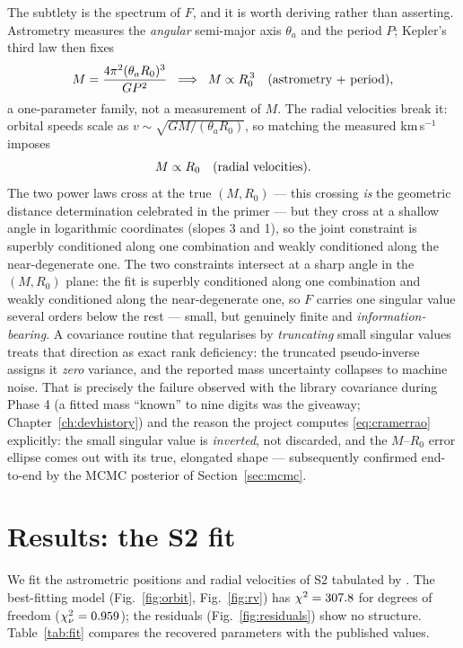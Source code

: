 The subtlety is the spectrum of $F$, and it is worth deriving rather
than asserting. Astrometry measures the \emph{angular} semi-major axis
$\theta_a$ and the period $P$; Kepler's third law then fixes
\begin{equation}
M = \frac{4\pi^2 (\theta_a R_0)^3}{G P^2}
\;\;\Longrightarrow\;\;
M \propto R_0^{\,3} \quad \hbox{(astrometry + period)},
\label{eq:astroconstraint}
\end{equation}
a one-parameter family, not a measurement of $M$. The radial
velocities break it: orbital speeds scale as
$v \sim \sqrt{GM/(\theta_a R_0)}$, so matching the measured
km\,s$^{-1}$ imposes
\begin{equation}
M \propto R_0 \quad \hbox{(radial velocities)}.
\label{eq:rvconstraint}
\end{equation}
The two power laws cross at the true $(M, R_0)$ — this crossing
\emph{is} the geometric distance determination celebrated in the
primer — but they cross at a shallow angle in logarithmic coordinates
(slopes 3 and 1), so the joint constraint is superbly conditioned
along one combination and weakly conditioned along the
near-degenerate one. The two constraints intersect at a sharp
angle in the $(M, R_0)$ plane: the fit is superbly conditioned along
one combination and weakly conditioned along the near-degenerate one,
so $F$ carries one singular value several orders below the rest —
small, but genuinely finite and \emph{information-bearing}. A
covariance routine that regularises by \emph{truncating} small singular
values treats that direction as exact rank deficiency: the truncated
pseudo-inverse assigns it \emph{zero} variance, and the reported mass
uncertainty collapses to machine noise. That is precisely the failure
observed with the library covariance during Phase 4 (a fitted mass
``known'' to nine digits was the giveaway; Chapter~\ref{ch:devhistory})
and the reason the project computes \eqref{eq:cramerrao} explicitly:
the small singular value is \emph{inverted}, not discarded, and the
$M$--$R_0$ error ellipse comes out with its true, elongated shape —
subsequently confirmed end-to-end by the MCMC posterior of
Section~\ref{sec:mcmc}.

\section{Results: the S2 fit}
\label{sec:s2fit}

We fit the \FitNAst{} astrometric positions and \FitNRv{} radial
velocities of S2 tabulated by \citet{Gillessen2017}. The best-fitting model
(Fig.~\ref{fig:orbit}, Fig.~\ref{fig:rv}) has
$\chi^2 = 307.8$ for \FitDof{} degrees of freedom
($\chi^2_\nu = 0.959$); the residuals (Fig.~\ref{fig:residuals}) show
no structure. Table~\ref{tab:fit} compares the recovered parameters with
the published values.

